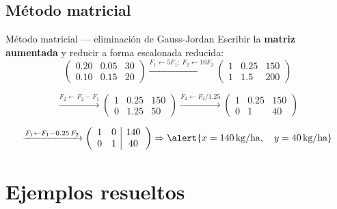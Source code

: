 \documentclass[11pt, aspectratio=169]{beamer}
\newcommand{\unidad}[1]{\,\text{#1}}
\begin{document}
	\subsection{Método matricial}
	
	\begin{frame}{Método matricial — eliminación de Gauss-Jordan}
		Escribir la \textbf{matriz aumentada} y reducir a forma escalonada reducida:
		\[
		\left(\begin{array}{cc|c}
			0.20 & 0.05 & 30 \\
			0.10 & 0.15 & 20
		\end{array}\right)
		\xrightarrow{F_1 \leftarrow 5F_1;\; F_2 \leftarrow 10F_2}
		\left(\begin{array}{cc|c}
			1 & 0.25 & 150 \\
			1 & 1.5  & 200
		\end{array}\right)
		\]
		
		\pause
		\[
		\xrightarrow{F_2 \leftarrow F_2 - F_1}
		\left(\begin{array}{cc|c}
			1 & 0.25 & 150 \\
			0 & 1.25 & 50
		\end{array}\right)
		\xrightarrow{F_2 \leftarrow F_2 / 1.25}
		\left(\begin{array}{cc|c}
			1 & 0.25 & 150 \\
			0 & 1    & 40
		\end{array}\right)
		\]
		
		\pause
		\[
		\xrightarrow{F_1 \leftarrow F_1 - 0.25\,F_2}
		\left(\begin{array}{cc|c}
			1 & 0 & 140 \\
			0 & 1 & 40
		\end{array}\right)
		\Rightarrow
		\alert{x = 140 \unidad{kg/ha}, \quad y = 40 \unidad{kg/ha}}
		\]
	\end{frame}
	
	\section{Ejemplos resueltos}
	
\end{document}
